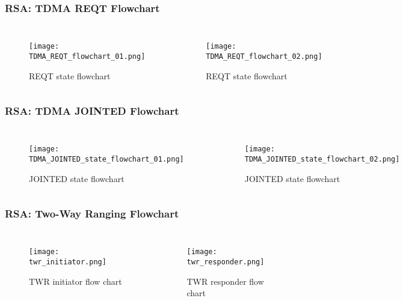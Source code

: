 \documentclass[10pt]{beamer}
\begin{document}
\begin{frame}
    \frametitle{RSA: TDMA REQT Flowchart}
    \begin{columns}
        \begin{figure}[H]
            \centering
            \texttt{[image: TDMA\_REQT\_flowchart\_01.png]}
            \caption{REQT state flowchart}
        \end{figure}
        \begin{figure}[H]
            \centering
            \texttt{[image: TDMA\_REQT\_flowchart\_02.png]}
            \caption{REQT state flowchart}
        \end{figure}
    \end{columns}
\end{frame}

\begin{frame}
    \frametitle{RSA: TDMA JOINTED Flowchart}
    \begin{columns}
        \begin{figure}[H]
            \centering
            \texttt{[image: TDMA\_JOINTED\_state\_flowchart\_01.png]}
            \caption{JOINTED state flowchart}
        \end{figure}
        \begin{figure}[H]
            \centering
            \texttt{[image: TDMA\_JOINTED\_state\_flowchart\_02.png]}
            \caption{JOINTED state flowchart}
        \end{figure}
    \end{columns}
\end{frame}

\begin{frame}
    \frametitle{RSA: Two-Way Ranging Flowchart}
    \begin{columns}
        \begin{figure}[H]
            \centering
            \texttt{[image: twr\_initiator.png]}
            \caption{TWR initiator flow chart}
        \end{figure}
        \begin{figure}[H]
            \centering
            \texttt{[image: twr\_responder.png]}
            \caption{TWR responder flow chart}
        \end{figure}
    \end{columns}
\end{frame}
\end{document}
